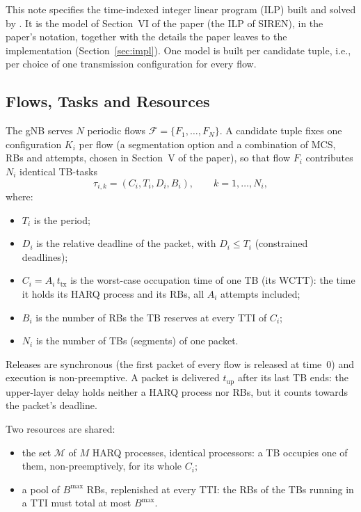 This note specifies the time-indexed integer linear program (ILP) built and
solved by . It is the model of
Section~VI of the paper (the ILP of SIREN), in the paper's notation, together
with the details the paper leaves to the implementation
(Section~\ref{sec:impl}). One model is built per candidate tuple, i.e., per
choice of one transmission configuration for every flow.

\subsection{Flows, Tasks and Resources}

The gNB serves $N$ periodic flows $\mathcal{F}=\{F_1,\dots,F_N\}$. A candidate
tuple fixes one configuration $K_i$ per flow (a segmentation option and a
combination of MCS, RBs and attempts, chosen in Section~V of the paper), so
that flow $F_i$ contributes $N_i$ identical TB-tasks
\[
\tau_{i,k}=(C_i, T_i, D_i, B_i), \qquad k=1,\dots,N_i,
\]
where:
\begin{itemize}
    \item $T_i$ is the period;
    \item $D_i$ is the relative deadline of the packet, with $D_i \le T_i$
          (constrained deadlines);
    \item $C_i = A_i\, t_\mathrm{tx}$ is the worst-case occupation time of one
          TB (its WCTT): the time it holds its HARQ process and its RBs,
          all $A_i$ attempts included;
    \item $B_i$ is the number of RBs the TB reserves at every TTI of $C_i$;
    \item $N_i$ is the number of TBs (segments) of one packet.
\end{itemize}
Releases are synchronous (the first packet of every flow is released at
time~$0$) and execution is non-preemptive. A packet is delivered
$t_\mathrm{up}$ after its last TB ends: the upper-layer delay holds neither a
HARQ process nor RBs, but it counts towards the packet's deadline.

Two resources are shared:
\begin{itemize}
    \item the set $\mathcal{M}$ of $M$ HARQ processes, identical processors:
          a TB occupies one of them, non-preemptively, for its whole $C_i$;
    \item a pool of $B^{\max}$ RBs, replenished at every TTI: the RBs of the
          TBs running in a TTI must total at most $B^{\max}$.
\end{itemize}

